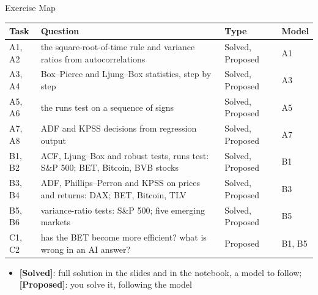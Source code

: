\begin{frame}{Exercise Map}
\itemsize{\small}
\begin{center}
\footnotesize
\begin{tabular}{>{\raggedright\arraybackslash}p{1.1cm}>{\raggedright\arraybackslash}p{7.5cm}>{\raggedright\arraybackslash}p{1.9cm}>{\raggedright\arraybackslash}p{1.4cm}}
\toprule
\textbf{Task} & \textbf{Question} & \textbf{Type} & \textbf{Model} \\
\midrule
A1, A2 & the square-root-of-time rule and variance ratios from autocorrelations & Solved, Proposed & A1 \\
A3, A4 & Box--Pierce and Ljung--Box statistics, step by step & Solved, Proposed & A3 \\
A5, A6 & the runs test on a sequence of signs & Solved, Proposed & A5 \\
A7, A8 & ADF and KPSS decisions from regression output & Solved, Proposed & A7 \\
B1, B2 & ACF, Ljung--Box and robust tests, runs test: S\&P 500; BET, Bitcoin, BVB stocks & Solved, Proposed & B1 \\
B3, B4 & ADF, Phillips--Perron and KPSS on prices and returns: DAX; BET, Bitcoin, TLV & Solved, Proposed & B3 \\
B5, B6 & variance-ratio tests: S\&P 500; five emerging markets & Solved, Proposed & B5 \\
C1, C2 & has the BET become more efficient? what is wrong in an AI answer? & Proposed & B1, B5 \\
\bottomrule
\end{tabular}
\end{center}
\begin{itemize}
    \item \textbf{[Solved]}: full solution in the slides and in the notebook, a model to follow; \textbf{[Proposed]}: you solve it, following the model
\end{itemize}
\end{frame}

